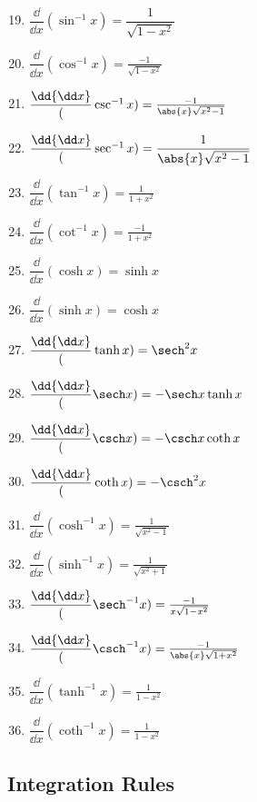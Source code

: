 \parbox{.24\linewidth}{%
\begin{enumerate}\setcounter{enumi}{18}
\item $\dfrac\dd{\dd x}(\sin^{-1}x)=\dfrac1{\sqrt{1-x^2}}$
\item $\dfrac\dd{\dd x}(\cos^{-1}x)=\frac{-1}{\sqrt{1-x^2}}$
\item $\dfrac\dd{\dd x}(\csc^{-1}x)=\frac{-1}{\abs{x}\sqrt{x^2-1}}$
\item $\dfrac\dd{\dd x}(\sec^{-1}x)=\dfrac1{\abs{x}\sqrt{x^2-1}}$%
\item $\dfrac\dd{\dd x}(\tan^{-1}x)=\frac1{1+x^2}$
\item $\dfrac\dd{\dd x}(\cot^{-1}x)=\frac{-1}{1+x^2}$
\item $\dfrac\dd{\dd x}(\cosh x)=\sinh x$
\item $\dfrac\dd{\dd x}(\sinh x)=\cosh x$
\item $\dfrac\dd{\dd x}(\tanh x)=\sech^2x$
\end{enumerate}}\hfill
\parbox{.24\linewidth}{%
\begin{enumerate}\setcounter{enumi}{27}
\item $\dfrac\dd{\dd x}(\sech x)=-\sech x\tanh x$
\item $\dfrac\dd{\dd x}(\csch x)=-\csch x\coth x$
\item $\dfrac\dd{\dd x}(\coth x)=-\csch^2 x$
\item $\dfrac\dd{\dd x}(\cosh^{-1}x)=\frac1{\sqrt{x^2-1}}$
\item $\dfrac\dd{\dd x}(\sinh^{-1}x)=\frac1{\sqrt{x^2+1}}$
\item $\dfrac\dd{\dd x}(\sech^{-1}x)=\frac{-1}{x\sqrt{1-x^2}}$
\item $\dfrac\dd{\dd x}(\csch^{-1}x)=\frac{-1}{\abs{x}\sqrt{1+x^2}}$
\item $\dfrac\dd{\dd x}(\tanh^{-1}x)=\frac1{1-x^2}$
\item $\dfrac\dd{\dd x}(\coth^{-1}x)=\frac1{1-x^2}$
\end{enumerate}}

\vspace{4\baselineskip}

\subsection{Integration Rules}

